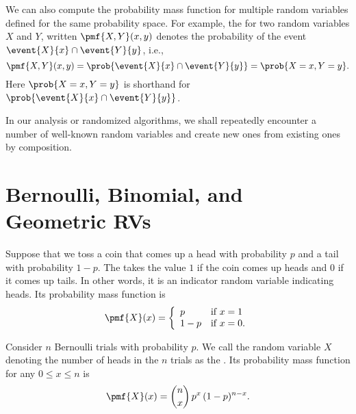 \begin{cluster}
\label{grp:grm:probability::randvar::compute}

\begin{gram}
\label{grm:probability::randvar::compute}
We can also compute the probability mass function for multiple random
variables defined for the same probability space.
For example, the  for two random
variables $X$ and $Y$, written $\pmf{X,Y}(x,y)$ denotes the
probability of the event $\event{X}{x} \cap \event{Y}{y}$, i.e.,
\[
\pmf{X,Y}(x,y) = \prob{\event{X}{x} \cap \event{Y}{y}} = \prob{X = x, Y = y}.
\]
Here
 $\prob{X = x, Y = y}$ is shorthand for   $\prob{\event{X}{x} \cap \event{Y}{y}}$.


In our analysis or randomized algorithms, we shall repeatedly
encounter a number of well-known random variables and create new ones
from existing ones by composition.

\end{gram}
\end{cluster}


\section{Bernoulli, Binomial, and Geometric RVs}
\label{sec:probability::randvar::standards}

\begin{cluster}
\label{grp:grm:probability::randvar::bernoulli-random-variable}

\begin{gram}
\label{grm:probability::randvar::bernoulli-random-variable}
Suppose that we toss a  coin that comes up a head with probability $p$
and a tail with probability $1-p$.
The  takes the value $1$ if the coin
comes up heads and $0$ if it comes up tails.
In other words, it is an indicator random variable indicating heads.
Its probability mass function is 
\[
\pmf{X}(x) = 
\left\{
\begin{array}{ll}
p & \mbox{if}~x = 1
\\
1-p & \mbox{if}~x = 0.
\end{array}
\right.
\]

\end{gram}
\end{cluster}

\begin{cluster}
\label{grp:grm:probability::randvar::binomial-random-variable}

\begin{gram}
\label{grm:probability::randvar::binomial-random-variable}
Consider $n$ Bernoulli trials with probability $p$.  We call the
random variable $X$ denoting the number of heads in the $n$ trials as
the .
Its probability mass function for any $0 \le x \le n$ is 
\[
\pmf{X}(x) = {n \choose x}\,p^x\,(1-p)^{n-x}.
\]

\end{gram}
\end{cluster}

